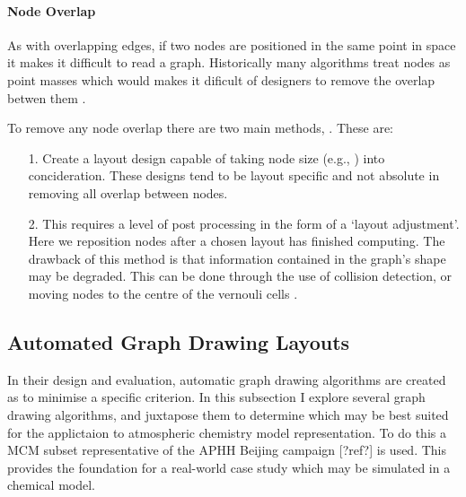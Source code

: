 \paragraph*{Node Overlap}
As with overlapping edges, if two nodes are positioned in the same point in space it makes it difficult to read a graph. Historically many algorithms treat nodes as point masses which would makes it dificult of designers to remove the overlap betwen them \cite{nodeoverlap}.

To remove any node overlap there are two main methods, \cite{IPSEPCOLA}. These are:

\begin{itemize}
\item [1.] Create a layout design capable of taking node size (e.g., \cite{nons}) into concideration. These designs tend to be layout specific and not absolute in removing all overlap between nodes. 
\item [2.] This requires a level of post processing in the form of a `layout adjustment'. Here we reposition nodes after a chosen layout has finished computing. The drawback of this method is that information contained in the graph's shape may be degraded. This can be done through the use of collision detection, or moving nodes to the centre of the vernouli cells \cite{novern}. 
\end{itemize}


% 
% 
% 



\subsection{Automated Graph Drawing Layouts}\label{sec:drawing}

In their design and evaluation, automatic graph drawing algorithms are created as to minimise a specific criterion. In this subsection I explore several graph drawing algorithms, and juxtapose them to determine which may be best suited for the applictaion to atmospheric chemistry model representation. To do this a MCM subset representative of the APHH Beijing campaign [?ref?] is used. This provides the foundation for a real-world case study which may be simulated in a chemical model. 

